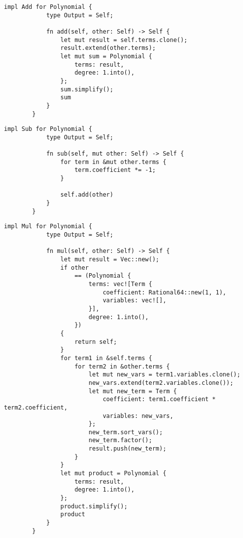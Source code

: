     \begin{lstlisting}[caption={The implementation of the addition operation for the \texttt{Polynomial} struct}, label={lst:polynomial-add}]
        impl Add for Polynomial {
            type Output = Self;
        
            fn add(self, other: Self) -> Self {
                let mut result = self.terms.clone();
                result.extend(other.terms);
                let mut sum = Polynomial {
                    terms: result,
                    degree: 1.into(),
                };
                sum.simplify();
                sum
            }
        }        
    \end{lstlisting}

    \begin{lstlisting}[caption={The implementation of the subtraction operation for the \texttt{Polynomial} struct}, label={lst:polynomial-sub}]
        impl Sub for Polynomial {
            type Output = Self;
        
            fn sub(self, mut other: Self) -> Self {
                for term in &mut other.terms {
                    term.coefficient *= -1;
                }
        
                self.add(other)
            }
        }        
    \end{lstlisting}

    \begin{lstlisting}[caption={The implementation of the multiplication operation for the \texttt{Polynomial} struct}, label={lst:polynomial-mul}]
        impl Mul for Polynomial {
            type Output = Self;
        
            fn mul(self, other: Self) -> Self {
                let mut result = Vec::new();
                if other
                    == (Polynomial {
                        terms: vec![Term {
                            coefficient: Rational64::new(1, 1),
                            variables: vec![],
                        }],
                        degree: 1.into(),
                    })
                {
                    return self;
                }
                for term1 in &self.terms {
                    for term2 in &other.terms {
                        let mut new_vars = term1.variables.clone();
                        new_vars.extend(term2.variables.clone());
                        let mut new_term = Term {
                            coefficient: term1.coefficient * term2.coefficient,
                            variables: new_vars,
                        };
                        new_term.sort_vars();
                        new_term.factor();
                        result.push(new_term);
                    }
                }
                let mut product = Polynomial {
                    terms: result,
                    degree: 1.into(),
                };
                product.simplify();
                product
            }
        }
    \end{lstlisting}
    
